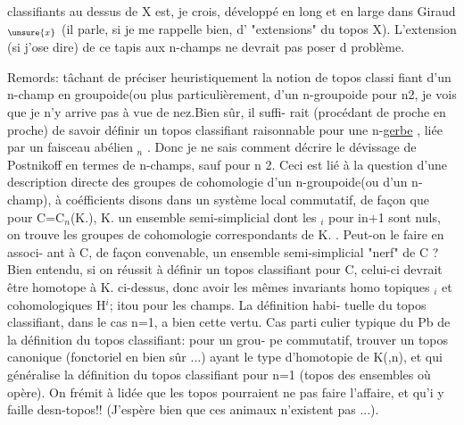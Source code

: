 classifiants au dessus de X est, je crois, développé en long et en large
dans Giraud$_{\unsure{x}}$ (il parle, si je me rappelle bien, d' "extensions" du topos X).
L'extension (si j'ose dire) de ce tapis aux n-champs ne devrait pas poser d
problème.

Remords: tâchant de préciser heuristiquement la notion de topos classi
fiant d'un n-champ en groupoide(ou plus particulièrement, d'un n-groupoide\hand{)}
pour n\hand{$\geqslant$}2, je vois que je n'y arrive pas à vue de nez.\hand{(}Bien sûr, il suffi-%
rait (procédant de proche en proche) de savoir définir un topos classifiant
raisonnable pour une n-\uline{gerbe} , liée par un faisceau abélien \hand{$\pi$}$_n$ .\hand{)} Donc je
ne sais comment décrire le dévissage de Postnikoff en termes de n-champs,
sauf pour n \hand{$\leqslant$}2. Ceci est lié à la question d'une description directe des
groupes de cohomologie d'un n-groupoide(ou d'un n-champ), à coéfficients
disons dans un système local commutatif, de façon que pour C=C$_n$(K.), K. un
ensemble semi-simplicial dont les \hand{$\pi$}$_i$ pour i\hand{$\geqslant$}n+1 sont nuls, on trouve les
groupes de cohomologie correspondants de K. . Peut-on le faire en associ-%
ant à C, de façon convenable, un ensemble semi-simplicial "nerf" de C ?
Bien entendu, si on réussit à définir un topos classifiant pour C, celui-ci
devrait être homotope à K. ci-dessus, donc avoir les mêmes invariants homo
topiques \hand{$\pi$}$_i$ et cohomologiques H$^i$; itou pour les champs. La définition habi-%
tuelle du topos classifiant, dans le cas n=1, a bien cette vertu. Cas parti
\hand{-}culier typique du Pb de la définition du topos classifiant: pour \hand{$\pi$}un grou-%
pe commutatif, trouver un topos canonique (fonctoriel en \hand{$\pi$} bien sûr ...)
ayant le type d'homotopie de K(\hand{$\pi$},n), et qui généralise la définition du
topos classifiant pour n=1 (topos des ensembles où \hand{$\pi$} opère). On frémit à
lidée que les topos pourraient ne pas faire l'affaire, et qu'i y faille
desn-topos!! (J'espère bien que ces animaux n'existent pas ...)\margin{\unsure{(\ \ )}}.

